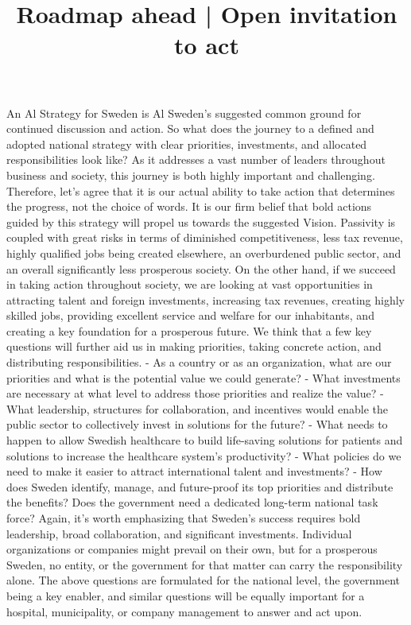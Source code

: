 \title{
Roadmap ahead | Open invitation to act
}
An Al Strategy for Sweden is Al Sweden's suggested common ground for continued discussion and action. So what does the journey to a defined and adopted national strategy with clear priorities, investments, and allocated responsibilities look like?
As it addresses a vast number of leaders throughout business and society, this journey is both highly important and challenging.
Therefore, let's agree that it is our actual ability to take action that determines the progress, not the choice of words. It is our firm belief that bold actions guided by this strategy will propel us towards the suggested Vision.
Passivity is coupled with great risks in terms of diminished competitiveness, less tax revenue, highly qualified jobs being created elsewhere, an overburdened public sector, and an overall significantly less prosperous society.
On the other hand, if we succeed in taking action throughout society, we are looking at vast opportunities in attracting talent and foreign investments, increasing tax revenues, creating highly skilled jobs, providing excellent service and welfare for our inhabitants, and creating a key foundation for a prosperous future.
We think that a few key questions will further aid us in making priorities, taking concrete action, and distributing responsibilities.
- As a country or as an organization, what are our priorities and what is the potential value we could generate?
- What investments are necessary at what level to address those priorities and realize the value?
- What leadership, structures for collaboration, and incentives would enable the public sector to collectively invest in solutions for the future?
- What needs to happen to allow Swedish healthcare to build life-saving solutions for patients and solutions to increase the healthcare system's productivity?
- What policies do we need to make it easier to attract international talent and investments?
- How does Sweden identify, manage, and future-proof its top priorities and distribute the benefits? Does the government need a dedicated long-term national task force?
Again, it's worth emphasizing that Sweden's success requires bold leadership, broad collaboration, and significant investments. Individual organizations or companies might prevail on their own, but for a prosperous Sweden, no entity, or the government for that matter can carry the responsibility alone.
The above questions are formulated for the national level, the government being a key enabler, and similar questions will be equally important for a hospital, municipality, or company management to answer and act upon.

